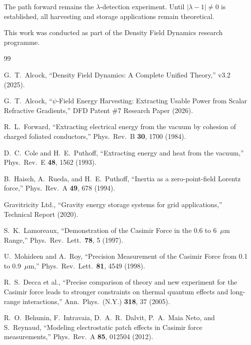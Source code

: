 \documentclass[aps,prd,twocolumn,showpacs,preprintnumbers,superscriptaddress,nofootinbib]{revtex4-2}
\begin{document}
The path forward remains the $\lambda$-detection experiment.  Until
$|\lambda-1| \neq 0$ is established, all harvesting and storage
applications remain theoretical.

\begin{acknowledgments}
This work was conducted as part of the Density Field Dynamics research
programme.
\end{acknowledgments}

\begin{thebibliography}{99}

G.~T.~Alcock, ``Density Field Dynamics: A Complete Unified Theory,''
v3.2 (2025).

G.~T.~Alcock, ``$\psi$-Field Energy Harvesting: Extracting Usable Power
from Scalar Refractive Gradients,'' DFD Patent \#7 Research Paper (2026).

R.~L.~Forward, ``Extracting electrical energy from the vacuum by
cohesion of charged foliated conductors,'' Phys.\ Rev.\ B \textbf{30},
1700 (1984).

D.~C.~Cole and H.~E.~Puthoff, ``Extracting energy and heat from the
vacuum,'' Phys.\ Rev.\ E \textbf{48}, 1562 (1993).

B.~Haisch, A.~Rueda, and H.~E.~Puthoff, ``Inertia as a zero-point-field
Lorentz force,'' Phys.\ Rev.\ A \textbf{49}, 678 (1994).

Gravitricity Ltd., ``Gravity energy storage systems for grid
applications,'' Technical Report (2020).

S.~K.~Lamoreaux, ``Demonstration of the Casimir Force in the 0.6 to
6~$\mu$m Range,'' Phys.\ Rev.\ Lett.\ \textbf{78}, 5 (1997).

U.~Mohideen and A.~Roy, ``Precision Measurement of the Casimir Force
from 0.1 to 0.9~$\mu$m,'' Phys.\ Rev.\ Lett.\ \textbf{81}, 4549 (1998).

R.~S.~Decca et al., ``Precise comparison of theory and new experiment
for the Casimir force leads to stronger constraints on thermal quantum
effects and long-range interactions,'' Ann.\ Phys.\ (N.Y.) \textbf{318},
37 (2005).

R.~O.~Behunin, F.~Intravaia, D.~A.~R.~Dalvit, P.~A.~Maia Neto, and
S.~Reynaud, ``Modeling electrostatic patch effects in Casimir force
measurements,'' Phys.\ Rev.\ A \textbf{85}, 012504 (2012).


\end{thebibliography}
\end{document}

